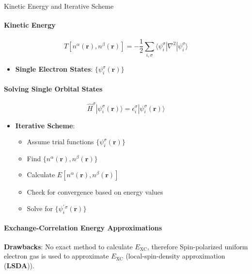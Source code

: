 \documentclass{beamer}
\begin{document}
\begin{frame}{Kinetic Energy and Iterative Scheme}
	\framesubtitle{Kinetic Energy}
	\[
	T[n^\alpha(\mathbf{r}), n^\beta(\mathbf{r})] = -\frac{1}{2}\sum_{i, \sigma} \langle \psi_i^\sigma | \nabla^2 | \psi_i^\sigma \rangle
	\]
	\begin{itemize}
		\item \textbf{Single Electron States}: $\{\psi_i^\sigma(\mathbf{r})\}$
	\end{itemize}
	\framesubtitle{Solving Single Orbital States}
	\[
	\hat{H}^\sigma|\psi_i^\sigma(\mathbf{r})\rangle = \epsilon_i^\sigma |\psi_i^\sigma(\mathbf{r})\rangle
	\]
	\begin{itemize}
		\item \textbf{Iterative Scheme}:
		\begin{itemize}
			\item Assume trial functions $\{\psi_i^\sigma(\mathbf{r})\}$
			\item Find $\{n^\alpha(\mathbf{r}), n^\beta(\mathbf{r})\}$
			\item Calculate $E[n^\alpha(\mathbf{r}), n^\beta(\mathbf{r})]$
			\item Check for convergence based on energy values
			\item Solve for $\{\psi^\prime_i^\sigma(\mathbf{r})\}$
			
		\end{itemize}
	\end{itemize}
	\framesubtitle{Exchange-Correlation Energy Approximations}
	\item \textbf{Drawbacks}: No exact method to calculate $E_{\text{XC}}$, therefore Spin-polarized uniform electron gas is used to approximate  $E_{\text{XC}}$ (local-spin-density approximation (\textbf{LSDA})).
	
\end{frame}
\end{document}
